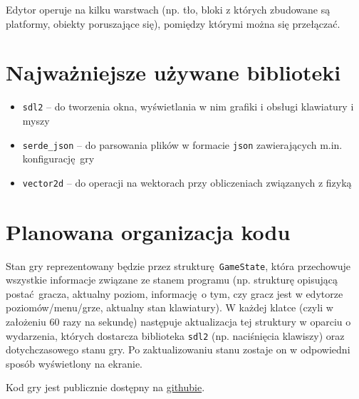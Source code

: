 \documentclass[12pt, a4paper, oneside]{article}
\begin{document}
Edytor operuje na kilku warstwach (np. tło, bloki z których zbudowane są 
platformy, obiekty poruszające się), pomiędzy którymi można się przełączać.

\section*{Najważniejsze używane biblioteki}

\begin{itemize} 
    \item{\texttt{sdl2} -- do tworzenia okna, wyświetlania w nim grafiki i 
    obsługi klawiatury i myszy}
    \item{\texttt{serde\_json} -- do parsowania plików w formacie \texttt{json} 
    zawierających m.in. konfigurację gry}
    \item{\texttt{vector2d} -- do operacji na wektorach przy obliczeniach 
    związanych z fizyką}
\end{itemize}

\section*{Planowana organizacja kodu}

Stan gry reprezentowany będzie przez strukturę \texttt{GameState}, która 
przechowuje wszystkie informacje związane ze stanem programu (np. strukturę 
opisującą postać gracza, aktualny poziom, informację o tym, czy gracz jest w 
edytorze poziomów/menu/grze, aktualny stan klawiatury). W każdej klatce (czyli 
w założeniu 60 razy na sekundę) następuje aktualizacja tej struktury w oparciu 
o wydarzenia, których dostarcza biblioteka \texttt{sdl2} (np. naciśnięcia 
klawiszy) oraz dotychczasowego stanu gry. Po zaktualizowaniu stanu zostaje on w 
odpowiedni sposób wyświetlony na ekranie.

Kod gry jest publicznie dostępny na \href{https://github.com/JakubGrobelny/mario-clone}{githubie}.
\end{document}
